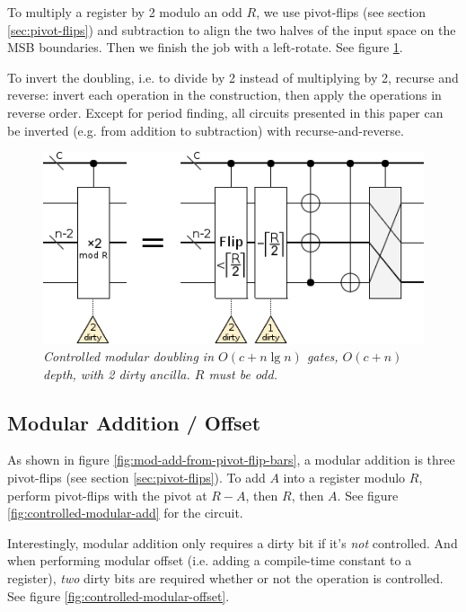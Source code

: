 \documentclass[twocolumn]{article}
\begin{document}
To multiply a register by 2 modulo an odd $R$, we use pivot-flips (see section \ref{sec:pivot-flips}) and subtraction to align the two halves of the input space on the MSB boundaries.
Then we finish the job with a left-rotate.
See figure \ref{fig:modular-double}.

To invert the doubling, i.e. to divide by 2 instead of multiplying by 2, recurse and reverse: invert each operation in the construction, then apply the operations in reverse order. 
Except for period finding, all circuits presented in this paper can be inverted (e.g. from addition to subtraction) with recurse-and-reverse.

\begin{figure}
  \centering
  \includegraphics[width=\linewidth]{assets/controlled-modular-double.png}
  \caption{\em
    Controlled modular doubling in $O(c + n \lg n)$ gates, $O(c + n)$ depth, with 2 dirty ancilla.
    $R$ must be odd.
  }
  \label{fig:modular-double}
\end{figure}


\subsection{Modular Addition / Offset}

As shown in figure \ref{fig:mod-add-from-pivot-flip-bars}, a modular addition is three pivot-flips (see section \ref{sec:pivot-flips}).
To add $A$ into a register modulo $R$, perform pivot-flips with the pivot at $R-A$, then $R$, then $A$.
See figure \ref{fig:controlled-modular-add} for the circuit.

Interestingly, modular addition only requires a dirty bit if it's {\em not} controlled.
And when performing modular offset (i.e. adding a compile-time constant to a register), {\em two} dirty bits are required whether or not the operation is controlled.
See figure \ref{fig:controlled-modular-offset}.
\end{document}
